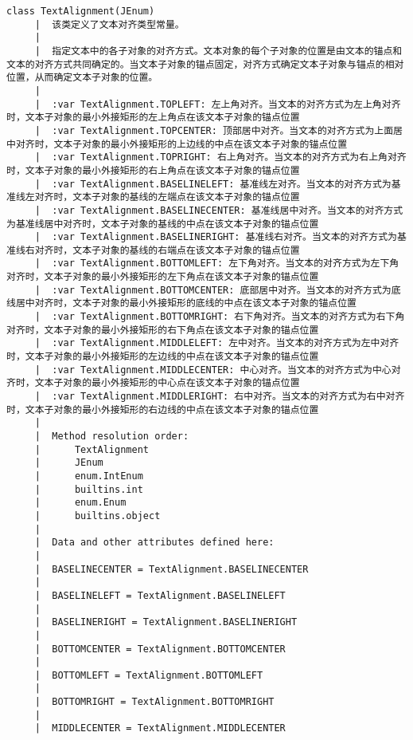\documentclass[11pt]{article}
\begin{document}
\begin{Verbatim}[commandchars=\\\{\}]
    class TextAlignment(JEnum)
     |  该类定义了文本对齐类型常量。
     |  
     |  指定文本中的各子对象的对齐方式。文本对象的每个子对象的位置是由文本的锚点和文本的对齐方式共同确定的。当文本子对象的锚点固定，对齐方式确定文本子对象与锚点的相对位置，从而确定文本子对象的位置。
     |  
     |  :var TextAlignment.TOPLEFT: 左上角对齐。当文本的对齐方式为左上角对齐时，文本子对象的最小外接矩形的左上角点在该文本子对象的锚点位置
     |  :var TextAlignment.TOPCENTER: 顶部居中对齐。当文本的对齐方式为上面居中对齐时，文本子对象的最小外接矩形的上边线的中点在该文本子对象的锚点位置
     |  :var TextAlignment.TOPRIGHT: 右上角对齐。当文本的对齐方式为右上角对齐时，文本子对象的最小外接矩形的右上角点在该文本子对象的锚点位置
     |  :var TextAlignment.BASELINELEFT: 基准线左对齐。当文本的对齐方式为基准线左对齐时，文本子对象的基线的左端点在该文本子对象的锚点位置
     |  :var TextAlignment.BASELINECENTER: 基准线居中对齐。当文本的对齐方式为基准线居中对齐时，文本子对象的基线的中点在该文本子对象的锚点位置
     |  :var TextAlignment.BASELINERIGHT: 基准线右对齐。当文本的对齐方式为基准线右对齐时，文本子对象的基线的右端点在该文本子对象的锚点位置
     |  :var TextAlignment.BOTTOMLEFT: 左下角对齐。当文本的对齐方式为左下角对齐时，文本子对象的最小外接矩形的左下角点在该文本子对象的锚点位置
     |  :var TextAlignment.BOTTOMCENTER: 底部居中对齐。当文本的对齐方式为底线居中对齐时，文本子对象的最小外接矩形的底线的中点在该文本子对象的锚点位置
     |  :var TextAlignment.BOTTOMRIGHT: 右下角对齐。当文本的对齐方式为右下角对齐时，文本子对象的最小外接矩形的右下角点在该文本子对象的锚点位置
     |  :var TextAlignment.MIDDLELEFT: 左中对齐。当文本的对齐方式为左中对齐时，文本子对象的最小外接矩形的左边线的中点在该文本子对象的锚点位置
     |  :var TextAlignment.MIDDLECENTER: 中心对齐。当文本的对齐方式为中心对齐时，文本子对象的最小外接矩形的中心点在该文本子对象的锚点位置
     |  :var TextAlignment.MIDDLERIGHT: 右中对齐。当文本的对齐方式为右中对齐时，文本子对象的最小外接矩形的右边线的中点在该文本子对象的锚点位置
     |  
     |  Method resolution order:
     |      TextAlignment
     |      JEnum
     |      enum.IntEnum
     |      builtins.int
     |      enum.Enum
     |      builtins.object
     |  
     |  Data and other attributes defined here:
     |  
     |  BASELINECENTER = TextAlignment.BASELINECENTER
     |  
     |  BASELINELEFT = TextAlignment.BASELINELEFT
     |  
     |  BASELINERIGHT = TextAlignment.BASELINERIGHT
     |  
     |  BOTTOMCENTER = TextAlignment.BOTTOMCENTER
     |  
     |  BOTTOMLEFT = TextAlignment.BOTTOMLEFT
     |  
     |  BOTTOMRIGHT = TextAlignment.BOTTOMRIGHT
     |  
     |  MIDDLECENTER = TextAlignment.MIDDLECENTER

\end{Verbatim}
\end{document}
